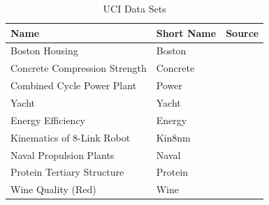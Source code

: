 	\begin{table}
		\centering
		\begin{tabular}{lll}
			\toprule
			\textbf{Name}                 & \textbf{Short Name} & \textbf{Source}\cite{duaUCIMachineLearning2017}                  \\ \midrule
			Boston Housing                & Boston              &                                                                  \\
			Concrete Compression Strength & Concrete            & \cite{yehModelingStrengthHighperformance1998}                    \\
			Combined Cycle Power Plant    & Power               & \cite{kayaLocalGlobalLearning2012,tufekciPredictionFullLoad2014} \\
			Yacht                         & Yacht               &                                                                  \\
			Energy Efficiency             & Energy              & \cite{tsanasAccurateQuantitativeEstimation2012}                  \\
			Kinematics of 8-Link Robot    & Kin8nm              &                                                                  \\
			Naval Propulsion Plants       & Naval               & \cite{coradduMachineLearningApproaches2016}                      \\
			Protein Tertiary Structure    & Protein             &                                                                  \\
			Wine Quality (Red)            & Wine                & \cite{cortezModelingWinePreferences2009}                         \\ \bottomrule
		\end{tabular}
		\caption{\acs{UCI} Data Sets}
		\label{tab:dataUci}
	\end{table}

